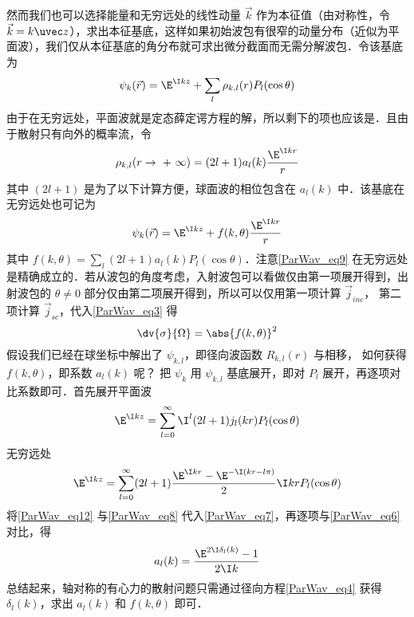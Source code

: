 然而我们也可以选择能量和无穷远处的线性动量 $\vec k$ 作为本征值（由对称性，令 $\vec k=k\uvec z$），求出本征基底，这样如果初始波包有很窄的动量分布（近似为平面波），我们仅从本征基底的角分布就可求出微分截面而无需分解波包．令该基底为
\begin{equation}\label{ParWav_eq7}
\psi_k(\vec r) = \E^{\I kz} + \sum_l \rho_{k,l}(r) P_l(\cos \theta)
\end{equation}
由于在无穷远处，平面波就是定态薛定谔方程的解，所以剩下的项也应该是．且由于散射只有向外的概率流，令
\begin{equation}\label{ParWav_eq8}
{\rho_{k,l}}(r \to {\text{ + }}\infty ) = (2l + 1){a_l}(k)\frac{\E^{\I kr}}{r}
\end{equation}
其中 $(2l + 1)$ 是为了以下计算方便，球面波的相位包含在 ${a_l}(k)$ 中．该基底在无穷远处也可记为
\begin{equation}\label{ParWav_eq9}
\psi_k(\vec r) = \E^{\I kz} + f(k,\theta )\frac{\E^{\I kr}}{r}
\end{equation}
其中 $f(k,\theta) = \sum_l (2l + 1) a_l(k) P_l(\cos \theta)$．注意\autoref{ParWav_eq9} 在无穷远处是精确成立的．若从波包的角度考虑，入射波包可以看做仅由第一项展开得到，出射波包的 $\theta  \ne 0$ 部分仅由第二项展开得到，所以可以仅用第一项计算 $\vec j_{inc}$， 第二项计算 $\vec j_{sc}$，代入\autoref{ParWav_eq3} 得
\begin{equation}
\dv{\sigma }{\Omega} = \abs{f(k,\theta)}^2
\end{equation}
假设我们已经在球坐标中解出了 $\psi_{k,l}$，即径向波函数 $R_{k,l}(r)$ 与相移， 如何获得 $f(k,\theta )$，即系数 $a_l(k)$ 呢？ 把 $\psi_k$ 用 $\psi_{k,l}$ 基底展开，即对 $P_l$ 展开，再逐项对比系数即可．首先展开平面波
\begin{equation}
\E^{\I kz} = \sum_{l = 0}^\infty  \I^l (2l + 1) j_l(kr) P_l(\cos \theta)
\end{equation}
无穷远处
\begin{equation}\label{ParWav_eq12}
\E^{\I kz} = \sum_{l=0}^\infty  (2l + 1)\frac{\E^{\I kr} - \E^{-\I(kr - l\pi)}} 2\I kr P_l(\cos \theta)
\end{equation}
将\autoref{ParWav_eq12} 与\autoref{ParWav_eq8} 代入\autoref{ParWav_eq7}，再逐项与\autoref{ParWav_eq6} 对比，得
\begin{equation}
a_l(k) = \frac{\E^{2\I \delta_l(k)} - 1}{2\I k}
\end{equation}
总结起来，轴对称的有心力的散射问题只需通过径向方程\autoref{ParWav_eq4} 获得 $\delta_l (k)$，求出 $a_l(k)$ 和 $f(k, \theta)$ 即可．

